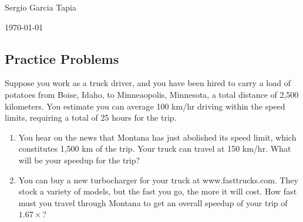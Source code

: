 \documentclass[12pt]{article}
\newenvironment{ex}[2][Exercise]{\begin{trivlist}
		\item[\hskip \labelsep {\bfseries #1}\hskip \labelsep {\bfseries #2.}]}{\end{trivlist}}
\begin{document}

\noindent Sergio Garcia Tapia \hfill

 \hfill

 \hfill 

\noindent\today

\subsection*{Practice Problems}
\begin{ex}{1.1}
	Suppose  you  work as a truck driver, and you have been hired to carry
	a load of potatoes from Boise, Idaho, to Minneaopolis, Minnesota, a
	total distance of 2,500 kilometers. You estimate you can average
	100 km/hr driving within the speed limits, requiring a total of 25
	hours for the trip.
	\begin{enumerate}[label=(\alph*)]
		\item You hear on the news that Montana has just abolished its
		speed limit, which constitutes 1,500 km of the trip. Your
		truck can travel at 150 km/hr. What will be your speedup
		for the trip?
		\item You can buy a new turbocharger for your truck at
		www.fasttrucks.com. They stock a variety of models, but
		the fast you go, the more it will cost. How fast must you travel
		through Montana to get an overall speedup of your trip of $1.67\times$?
	\end{enumerate}
\end{ex}
\end{document}
